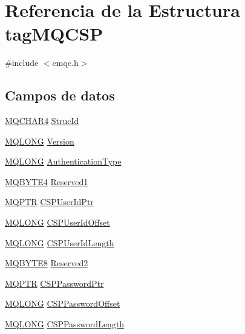 \hypertarget{structtag_m_q_c_s_p}{}\section{Referencia de la Estructura tag\+M\+Q\+C\+S\+P}
\label{structtag_m_q_c_s_p}


{\ttfamily \#include $<$cmqc.\+h$>$}

\subsection*{Campos de datos}
\begin{DoxyCompactItemize}
\item 
\hyperlink{cmqc_8h_a12590e546ed66fda7cf21c1d5cefa31d}{M\+Q\+C\+H\+A\+R4} \hyperlink{structtag_m_q_c_s_p_a0530922ca944569b52601d74941f96e4}{Struc\+Id}
\item 
\hyperlink{cmqc_8h_a1fb8d28cbda3fa8766a9821230cdb6d5}{M\+Q\+L\+O\+N\+G} \hyperlink{structtag_m_q_c_s_p_a0656ef8f766b3907d394d88a35d7b7e9}{Version}
\item 
\hyperlink{cmqc_8h_a1fb8d28cbda3fa8766a9821230cdb6d5}{M\+Q\+L\+O\+N\+G} \hyperlink{structtag_m_q_c_s_p_a93f1337530018caf4ee90bcd57f0b097}{Authentication\+Type}
\item 
\hyperlink{cmqc_8h_adf43961141ea57bdc167cfe3ee569cdc}{M\+Q\+B\+Y\+T\+E4} \hyperlink{structtag_m_q_c_s_p_a740233cdc4196cbb81a6891c320232cf}{Reserved1}
\item 
\hyperlink{cmqc_8h_a0b835d8e479d7c42242ed9c6b6572f5a}{M\+Q\+P\+T\+R} \hyperlink{structtag_m_q_c_s_p_aea9286fc5888c80fc6f7ee4788ac80bd}{C\+S\+P\+User\+Id\+Ptr}
\item 
\hyperlink{cmqc_8h_a1fb8d28cbda3fa8766a9821230cdb6d5}{M\+Q\+L\+O\+N\+G} \hyperlink{structtag_m_q_c_s_p_aff892208784ec4ceb7c6c33d3ca37547}{C\+S\+P\+User\+Id\+Offset}
\item 
\hyperlink{cmqc_8h_a1fb8d28cbda3fa8766a9821230cdb6d5}{M\+Q\+L\+O\+N\+G} \hyperlink{structtag_m_q_c_s_p_ab79103c753d41fbe5753501a33ab6994}{C\+S\+P\+User\+Id\+Length}
\item 
\hyperlink{cmqc_8h_a2b336cfdd97257746e5e321bfb35fb9b}{M\+Q\+B\+Y\+T\+E8} \hyperlink{structtag_m_q_c_s_p_a7aaec4816b30006552c1ee477716f64d}{Reserved2}
\item 
\hyperlink{cmqc_8h_a0b835d8e479d7c42242ed9c6b6572f5a}{M\+Q\+P\+T\+R} \hyperlink{structtag_m_q_c_s_p_a6bc99337133ec24b870061e19944c9f0}{C\+S\+P\+Password\+Ptr}
\item 
\hyperlink{cmqc_8h_a1fb8d28cbda3fa8766a9821230cdb6d5}{M\+Q\+L\+O\+N\+G} \hyperlink{structtag_m_q_c_s_p_a335e93bfba0a58a7fa4b505df5cd727f}{C\+S\+P\+Password\+Offset}
\item 
\hyperlink{cmqc_8h_a1fb8d28cbda3fa8766a9821230cdb6d5}{M\+Q\+L\+O\+N\+G} \hyperlink{structtag_m_q_c_s_p_a0693ca8dafce34e22d0462b1fd124474}{C\+S\+P\+Password\+Length}
\end{DoxyCompactItemize}


